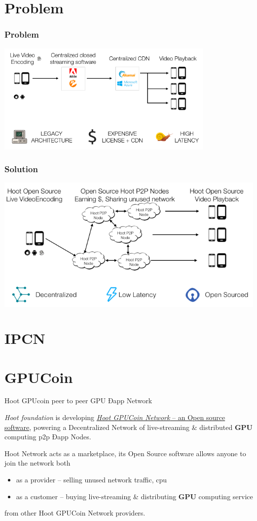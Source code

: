 \section{Problem}
\begin{frame}[t]\frametitle{Problem}
 \includegraphics[width=0.8\textwidth]{static/problem-architecture-trans}
\end{frame}
\begin{frame}[t]\frametitle{Solution}
 \includegraphics[width=.8\textwidth]{static/hoot-solution-trans}

\end{frame}
\section{IPCN}

\section{GPUCoin}
\begin{frame}[fragile]{Hoot GPUcoin peer to peer GPU Ðapp Network }

\emph{ Hoot foundation} is developing \href{https://onhoot.com/static/gpucoin-ico}{\emph{Hoot GPUCoin Network} – an Open source software}, powering a Decentralized Network of live-streaming \& distributed \textbf{GPU} computing p2p Ðapp Nodes.
 

Hoot Network acts as a marketplace, its Open Source software allows anyone to join the network both 

\begin{itemize}
\item as a provider – selling unused network traffic, cpu
\item as a customer – buying live-streaming \& distributing \textbf{GPU} computing service
\end{itemize}
 from other Hoot GPUCoin Network providers. 
\end{frame}

